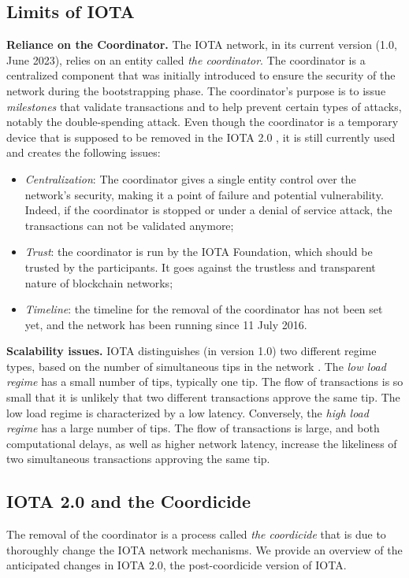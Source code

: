 \subsection{Limits of IOTA}
\textbf{Reliance on the Coordinator.} The IOTA network, in its current version (1.0, June 2023), relies on an entity called \emph{the coordinator}.
The coordinator is a centralized component that was initially introduced to ensure the security of the network during the bootstrapping phase.
The coordinator's purpose is to issue \emph{milestones} that validate transactions and to help prevent certain types of attacks, notably the double-spending attack.
Even though the coordinator is a temporary device that is supposed to be removed in the IOTA 2.0 \cite{Popov2020}, it is still currently used 
and creates the following issues:
\begin{itemize}
  \item \emph{Centralization}: The coordinator gives a single entity control over the network's security, making it a point of failure and potential vulnerability.
  Indeed, if the coordinator is stopped or under a denial of service attack, the transactions can not be validated anymore;
  \item \emph{Trust}: the coordinator is run by the IOTA Foundation, which should be trusted by the participants. It 
  goes against the trustless and transparent nature of blockchain networks;
  \item \emph{Timeline}: the timeline for the removal of the coordinator has not been set yet, and 
  the network has been running since 11 July 2016.  
\end{itemize}


\textbf{Scalability issues.} IOTA distinguishes (in version 1.0) two different regime types, based on the number of 
simultaneous tips in the network \cite{Popov2017}. The \emph{low load regime}  has a small number of tips, typically one tip.
The flow of transactions is so small that it is unlikely that two different transactions approve the same tip. The 
low load regime is characterized by a low latency. Conversely, the \emph{high load regime} has a large number of tips. 
The flow of transactions is large, and both computational delays, as well as higher network latency, increase the likeliness of 
two simultaneous transactions approving the same tip. 


\subsection{IOTA 2.0 and the Coordicide}
The removal of the coordinator is a process called \emph{the coordicide} \cite{Popov2020} that is due to thoroughly change the 
IOTA network mechanisms. We provide an overview of the anticipated changes in IOTA 2.0, the post-coordicide version of IOTA.


